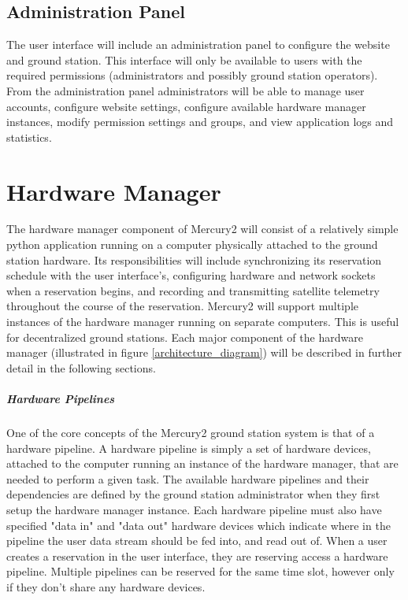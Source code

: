 \documentclass{mxl-design}
\begin{document}
\subsection{Administration Panel}
\label{sec:admin_panel}
The user interface will include an administration panel to configure the website and ground station. This interface will only be available to users with the required permissions (administrators and possibly ground station operators). From the administration panel administrators will be able to manage user accounts, configure website settings, configure available hardware manager instances, modify permission settings and groups, and view application logs and statistics.

\section{Hardware Manager}
\label{sec:hardware_manager}
The hardware manager component of Mercury2 will consist of a relatively simple python application running on a computer physically attached to the ground station hardware. Its responsibilities will include synchronizing its reservation schedule with the user interface's, configuring hardware and network sockets when a reservation begins, and recording and transmitting satellite telemetry throughout the course of the reservation. Mercury2 will support multiple instances of the hardware manager running on separate computers. This is useful for decentralized ground stations. Each major component of the hardware manager (illustrated in figure \ref{architecture_diagram}) will be described in further detail in the following sections. 

\subparagraph{Hardware Pipelines}
One of the core concepts of the Mercury2 ground station system is that of a hardware pipeline. A hardware pipeline is simply a set of hardware devices, attached to the computer running an instance of the hardware manager, that are needed to perform a given task. The available hardware pipelines and their dependencies are defined by the ground station administrator when they first setup the hardware manager instance. Each hardware pipeline must also have specified "data in" and "data out" hardware devices which indicate where in the pipeline the user data stream should be fed into, and read out of. When a user creates a reservation in the user interface, they are reserving access a hardware pipeline. Multiple pipelines can be reserved for the same time slot, however only if they don't share any hardware devices.
\end{document}
